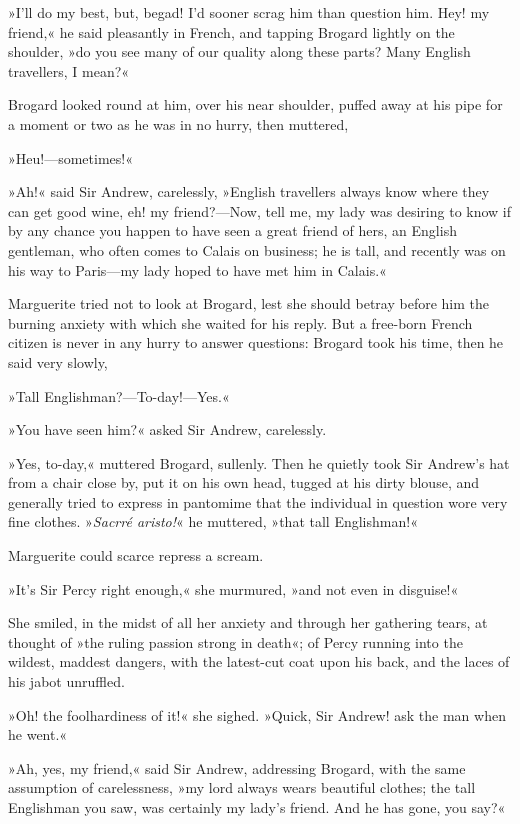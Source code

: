 »I'll do my best, but, begad! I'd sooner scrag him than question him. Hey! my friend,« he said pleasantly in French, and tapping Brogard lightly on the shoulder, »do you see many of our quality along these parts? Many English travellers, I mean?«

Brogard looked round at him, over his near shoulder, puffed away at his pipe for a moment or two as he was in no hurry, then muttered,\longdash


»Heu!—sometimes!«

»Ah!« said Sir Andrew, carelessly, »English travellers always know where they can get good wine, eh! my friend?—Now, tell me, my lady was desiring to know if by any chance you happen to have seen a great friend of hers, an English gentleman, who often comes to Calais on business; he is tall, and recently was on his way to Paris—my lady hoped to have met him in Calais.«

Marguerite tried not to look at Brogard, lest she should betray before him the burning anxiety with which she waited for his reply. But a free-born French citizen is never in any hurry to answer questions: Brogard took his time, then he said very slowly,\longdash


»Tall Englishman?—To-day!—Yes.«

»You have seen him?« asked Sir Andrew, carelessly.

»Yes, to-day,« muttered Brogard, sullenly. Then he quietly took Sir Andrew's hat from a chair close by, put it on his own head, tugged at his dirty blouse, and generally tried to express in pantomime that the individual in question wore very fine clothes. »\textit{Sacrré aristo!}« he muttered, »that tall Englishman!«

Marguerite could scarce repress a scream.

»It's Sir Percy right enough,« she murmured, »and not even in disguise!«

She smiled, in the midst of all her anxiety and through her gathering tears, at thought of »the ruling passion strong in death«; of Percy running into the wildest, maddest dangers, with the latest-cut coat upon his back, and the laces of his jabot unruffled.

»Oh! the foolhardiness of it!« she sighed. »Quick, Sir Andrew! ask the man when he went.«

»Ah, yes, my friend,« said Sir Andrew, addressing Brogard, with the same assumption of carelessness, »my lord always wears beautiful clothes; the tall Englishman you saw, was certainly my lady's friend. And he has gone, you say?«

